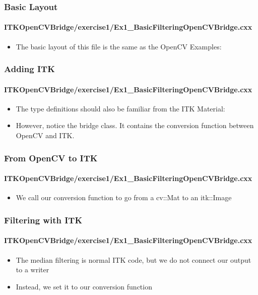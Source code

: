\begin{frame}
\frametitle{Basic Layout}
\framesubtitle{ITKOpenCVBridge/exercise1/Ex1\_BasicFilteringOpenCVBridge.cxx}
\begin{itemize}
\item The basic layout of this file is the same as the OpenCV
  Examples:
\end{itemize}
\end{frame}

\begin{frame}
\frametitle{Adding ITK}
\framesubtitle{ITKOpenCVBridge/exercise1/Ex1\_BasicFilteringOpenCVBridge.cxx}
\begin{itemize}
\item The type definitions should also be familiar from the ITK
  Material:
\item However, notice the bridge class. It contains the conversion function
between OpenCV and ITK.
\end{itemize}
\end{frame}

\begin{frame}
\frametitle{From OpenCV to ITK}
\framesubtitle{ITKOpenCVBridge/exercise1/Ex1\_BasicFilteringOpenCVBridge.cxx}
\begin{itemize}
\item We call our conversion function to go from a cv::Mat to an
  itk::Image
\end{itemize}
\end{frame}

\begin{frame}
\frametitle{Filtering with ITK}
\framesubtitle{ITKOpenCVBridge/exercise1/Ex1\_BasicFilteringOpenCVBridge.cxx}
\begin{itemize}
\item The median filtering is normal ITK code, but we do not connect our
output to a writer
\pause
\item Instead, we set it to our conversion function
\end{itemize}
\end{frame}

